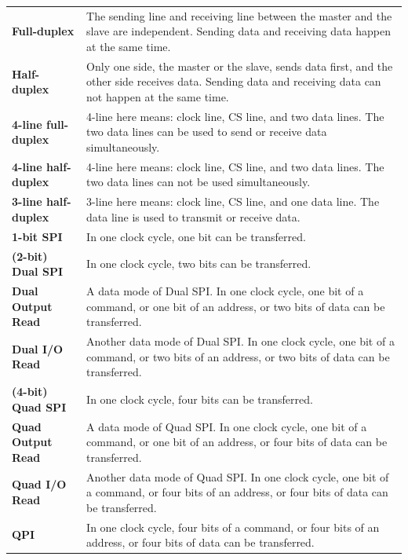 \begin{longtable}[c]{ R{7cm} p{10cm} }
\textbf{Full-duplex} & The sending line and receiving line between the master and the slave are independent. Sending data and receiving data happen at the same time. \\
\textbf{Half-duplex} & Only one side, the master or the slave, sends data first, and the other side receives data. Sending data and receiving data can not happen at the same time.\\
\textbf{4-line full-duplex} & 4-line here means: clock line, CS line, and two data lines. The two data lines can be used to send or receive data simultaneously.\\
\textbf{4-line half-duplex} & 4-line here means: clock line, CS line, and two data lines. The two data lines can not be used simultaneously.\\
\textbf{3-line half-duplex} & 3-line here means: clock line, CS line, and one data line. The data line is used to transmit or receive data. \\
\textbf{1-bit SPI} & In one clock cycle, one bit can be transferred.\\
\textbf{(2-bit) Dual SPI} & In one clock cycle, two bits can be transferred. \\
\textbf{Dual Output Read} & A data mode of Dual SPI. In one clock cycle, one bit of a command, or one bit of an address, or two bits of data can be transferred.\\
\textbf{Dual I/O Read} & Another data mode of Dual SPI. In one clock cycle, one bit of a command, or two bits of an address, or two bits of data can be transferred.\\
\textbf{(4-bit) Quad SPI} & In one clock cycle, four bits can be transferred. \\
\textbf{Quad Output Read} & A data mode of Quad SPI. In one clock cycle, one bit of a command, or one bit of an address, or four bits of data can be transferred.\\
\textbf{Quad I/O Read} & Another data mode of Quad SPI. In one clock cycle, one bit of a command, or four bits of an address, or four bits of data can be transferred.\\
\textbf{QPI} & In one clock cycle, four bits of a command, or four bits of an address, or four bits of data can be transferred.\\


\end{longtable}
